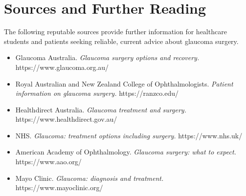 \section*{Sources and Further Reading}
The following reputable sources provide further information for healthcare students and patients seeking reliable, current advice about glaucoma surgery.

\begin{itemize}
    \item Glaucoma Australia. \textit{Glaucoma surgery options and recovery.} https://www.glaucoma.org.au/
    \item Royal Australian and New Zealand College of Ophthalmologists. \textit{Patient information on glaucoma surgery.} https://ranzco.edu/
    \item Healthdirect Australia. \textit{Glaucoma treatment and surgery.} https://www.healthdirect.gov.au/
    \item NHS. \textit{Glaucoma: treatment options including surgery.} https://www.nhs.uk/
    \item American Academy of Ophthalmology. \textit{Glaucoma surgery: what to expect.} https://www.aao.org/
    \item Mayo Clinic. \textit{Glaucoma: diagnosis and treatment.} https://www.mayoclinic.org/
\end{itemize}
